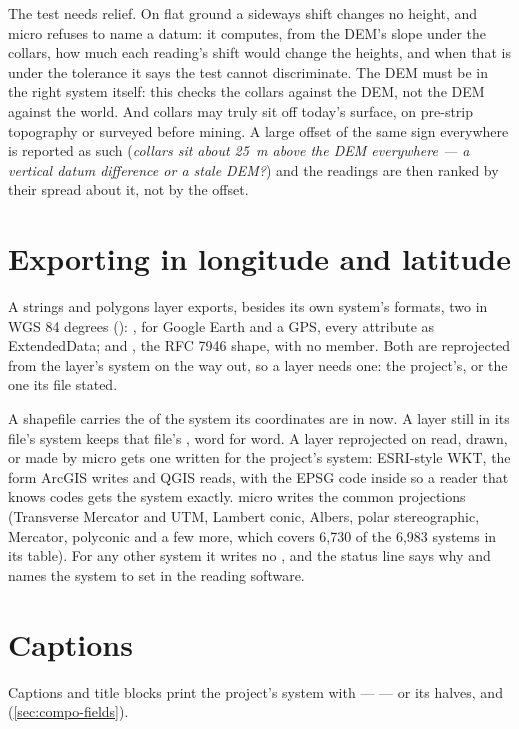 \begin{caution}
The test needs relief. On flat ground a sideways shift changes no height, and micro refuses to name a
datum: it computes, from the DEM's slope under the collars, how much each reading's shift would change
the heights, and when that is under the tolerance it says the test cannot discriminate. The DEM must be
in the right system itself: this checks the collars against the DEM, not the DEM against the world.
And collars may truly sit off today's surface, on pre-strip topography or surveyed before mining. A
large offset of the same sign everywhere is reported as such (\emph{collars sit about 25~m above the
DEM everywhere — a vertical datum difference or a stale DEM?}) and the readings are then ranked by
their spread about it, not by the offset.
\end{caution}

\section{Exporting in longitude and latitude}\label{sec:crs-export}

A strings and polygons layer exports, besides its own system's formats, two in WGS 84 degrees
(): , for Google Earth and a GPS, every attribute as ExtendedData; and
, the RFC 7946 shape, with no  member. Both are reprojected from the
layer's system on the way out, so a layer needs one: the project's, or the one its file stated.

A shapefile carries the  of the system its coordinates are in now. A layer still in its
file's system keeps that file's , word for word. A layer reprojected on read, drawn, or
made by micro gets one written for the project's system: ESRI-style WKT, the form ArcGIS writes and
QGIS reads, with the EPSG code inside so a reader that knows codes gets the system exactly. micro
writes the common projections (Transverse Mercator and UTM, Lambert conic, Albers, polar
stereographic, Mercator, polyconic and a few more, which covers 6,730 of the 6,983 systems in its
table). For any other system it writes no , and the status line says why and names the
system to set in the reading software.

\section{Captions}\label{sec:crs-captions}

Captions and title blocks print the project's system with  —
 — or its halves,  and
 (\cref{sec:compo-fields}).
